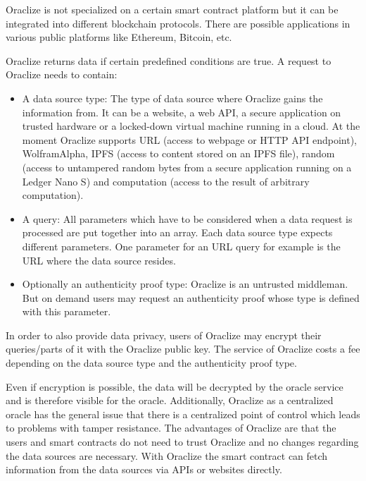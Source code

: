 \documentclass[conference]{IEEEtran}
\begin{document}
Oraclize is not specialized on a certain smart contract platform but it can be integrated into different blockchain protocols. There are possible applications in various public platforms like Ethereum, Bitcoin, etc. \cite{Oraclize2017} \par 
Oraclize returns data if certain predefined conditions are true. A request to Oraclize needs to contain:
\begin{itemize}
	\item A data source type: The type of data source where Oraclize gains the information from. It can be a website, a web API, a secure application on trusted hardware or a locked-down virtual machine running in a cloud. At the moment Oraclize supports URL (access to  webpage or HTTP API endpoint), WolframAlpha, IPFS (access to content stored on an IPFS file), random (access to untampered random bytes from a secure application running on a Ledger Nano S) and computation (access to the result of arbitrary computation).
	\item A query: All parameters which have to be considered when a data request is processed are put together into an array. Each data source type expects different parameters. One parameter for an URL query for example is the URL where the data source resides.
	\item Optionally an authenticity proof type: Oraclize is an untrusted middleman. But on demand users may request an authenticity proof whose type is defined with this parameter. \cite{Oraclize2017}
\end{itemize}
In order to also provide data privacy, users of Oraclize may encrypt their queries/parts of it with the Oraclize public key. The service of Oraclize costs a fee depending on the data source type and the authenticity proof type. \cite{Oraclize2017} \par
Even if encryption is possible, the data will be decrypted by the oracle service and is therefore visible for the oracle. Additionally, Oraclize as a centralized oracle has the general issue that there is a centralized point of control which leads to problems with tamper resistance. The advantages of Oraclize are that the users and smart contracts do not need to trust Oraclize and no changes regarding the data sources are necessary. With Oraclize the smart contract can fetch information from the data sources via APIs or websites directly. \cite{Ellis2017} \cite{Oraclize2017} \par    
\end{document}
